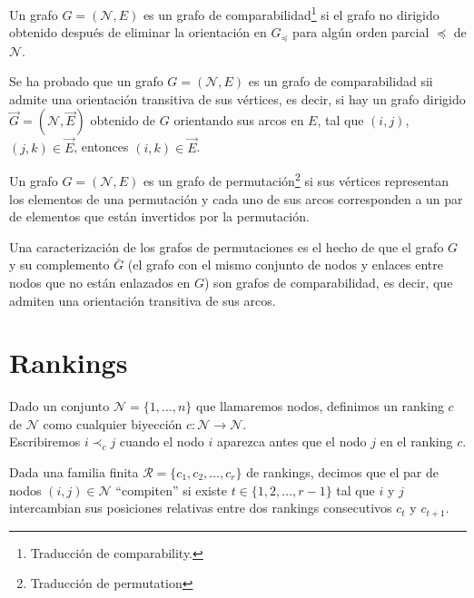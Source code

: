 \begin{defi}
Un grafo $G = (\mathcal{N}, E)$ es un grafo de comparabilidad\footnote{Traducción de comparability.} si el grafo no dirigido obtenido después de eliminar la orientación en $G_\preceq$ para algún orden parcial $\preceq$ de $\mathcal{N}$.  
\end{defi}

\begin{defi}
Se ha probado que un grafo $G = (\mathcal{N},E)$ es un grafo de comparabilidad sii admite una orientación transitiva de sus vértices, es decir, si hay un grafo dirigido $\vec{G} = (\mathcal{N}, \vec{E})$ obtenido de $G$ orientando sus arcos en $E$, tal que $(i,j)$, $(j,k) \in \vec{E}$, entonces $(i,k) \in \vec{E}$. 
\end{defi}

\begin{defi}
Un grafo $G = (\mathcal{N}, E)$ es un grafo de permutación\footnote{Traducción de permutation} si sus vértices representan los elementos de una permutación y cada uno de sus arcos corresponden a un par de elementos que están invertidos por la permutación.  
\end{defi}

\begin{nota}
Una caracterización de los grafos de permutaciones es el hecho de que el grafo $G$ y su complemento $\bar{G}$ (el grafo con el mismo conjunto de nodos y enlaces entre nodos que no están enlazados en $G$) son grafos de comparabilidad, es decir, que admiten una orientación transitiva de sus arcos.
\end{nota}



\section{Rankings}

\begin{defi}
Dado un conjunto $\mathcal{N} = \{1,\dots,n\}$ que llamaremos nodos, definimos un ranking $c$ de $\mathcal{N}$ como cualquier biyección $c: \mathcal{N} \to \mathcal{N}$.\\
Escribiremos $i \prec_c j$ cuando el nodo $i$ aparezca antes que el nodo $j$ en el ranking $c$.
\end{defi}

\begin{defi}
Dada una familia finita $\mathcal{R} = \{c_1,c_2,\dots, c_r\}$ de rankings, decimos que el par de nodos $(i,j) \in \mathcal{N}$ ``compiten'' si existe $t \in \{1,2,\dots, r-1\}$ tal que $i$ y $j$ intercambian sus posiciones relativas entre dos rankings consecutivos $c_t$ y $c_{t+1}$.
\end{defi}


